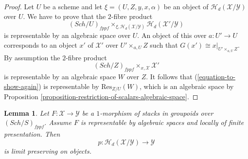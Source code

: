 \documentclass{stacks-project}
\theoremstyle{plain}
\newtheorem{lemma}[subsection]{Lemma}
\theoremstyle{definition}
\theoremstyle{remark}
\numberwithin{equation}{subsection}
\def\Sch{\mathit{Sch}}
\begin{document}
\begin{proof}
Let $U$ be a scheme and let $\xi = (U, Z, y, x, \alpha)$ be an object of
$\mathcal{H}_d(\mathcal{X}/\mathcal{Y})$ over $U$.
We have to prove that the $2$-fibre product
\begin{equation}
\label{equation-to-show-again}
(\Sch/U)_{fppf}
\times_{\xi, \mathcal{H}_d(\mathcal{X}/\mathcal{Y})}
\mathcal{H}_d(\mathcal{X}'/\mathcal{Y})
\end{equation}
is representable by an algebraic space over $U$.
An object of this over $a : U' \to U$ corresponds to an object
$x'$ of $\mathcal{X}'$ over $U' \times_{a, U} Z$ such that
$G(x') \cong x|_{U' \times_{a, U} Z}$. By assumption the $2$-fibre product
$$
(\Sch/Z)_{fppf} \times_{x, \mathcal{X}} \mathcal{X}'
$$
is representable by an algebraic space $W$ over $Z$. It follows that
(\ref{equation-to-show-again}) is representable by $\text{Res}_{Z/U}(W)$,
which is an algebraic space by
Proposition \ref{proposition-restriction-of-scalars-algebraic-space}.
\end{proof}

\begin{lemma}
\label{lemma-limit-preserving}
Let $F : \mathcal{X} \to \mathcal{Y}$ be a $1$-morphism of stacks in groupoids
over $(\Sch/S)_{fppf}$. Assume $F$ is representable by algebraic
spaces and locally of finite presentation. Then
$$
p : \mathcal{H}_d(\mathcal{X}/\mathcal{Y}) \to \mathcal{Y}
$$
is limit preserving on objects.
\end{lemma}
\end{document}
